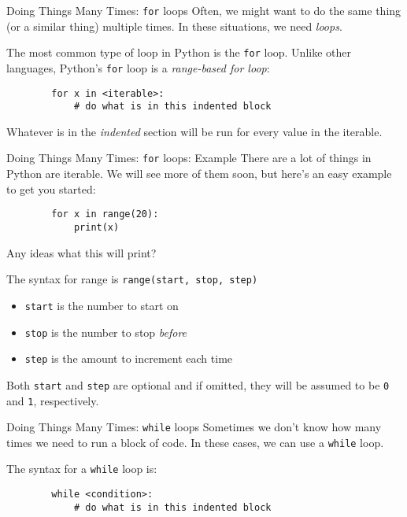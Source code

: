 \documentclass{acm}
\begin{document}
\begin{frame}[fragile]{Doing Things Many Times: \texttt{for} loops}
    Often, we might want to do the same thing (or a similar thing) multiple
    times. In these situations, we need \textit{loops}.

    \pause
    The most common type of loop in Python is the \texttt{for} loop. Unlike
    other languages, Python's \texttt{for} loop is a \textit{range-based for
    loop}:

    \begin{verbatim}
        for x in <iterable>:
            # do what is in this indented block
    \end{verbatim}

    Whatever is in the \textit{indented} section will be run for every value in
    the iterable.
\end{frame}

\begin{frame}[fragile]{Doing Things Many Times: \texttt{for} loops: Example}
    There are a lot of things in Python are iterable. We will see more of them
    soon, but here's an easy example to get you started:

    \begin{verbatim}
        for x in range(20):
            print(x)
    \end{verbatim}

    Any ideas what this will print?

    \pause
    The syntax for range is \texttt{range(start, stop, step)}
    \begin{itemize}
        \item \texttt{start} is the number to start on
        \item \texttt{stop} is the number to stop \textit{before}
        \item \texttt{step} is the amount to increment each time
    \end{itemize}

    Both \texttt{start} and \texttt{step} are optional and if omitted, they will
    be assumed to be \texttt{0} and \texttt{1}, respectively.
\end{frame}

\begin{frame}[fragile]{Doing Things Many Times: \texttt{while} loops}
    Sometimes we don't know how many times we need to run a block of code. In
    these cases, we can use a \texttt{while} loop.

    \pause
    The syntax for a \texttt{while} loop is:
    \begin{verbatim}
        while <condition>:
            # do what is in this indented block
    \end{verbatim}
\end{frame}
\end{document}
